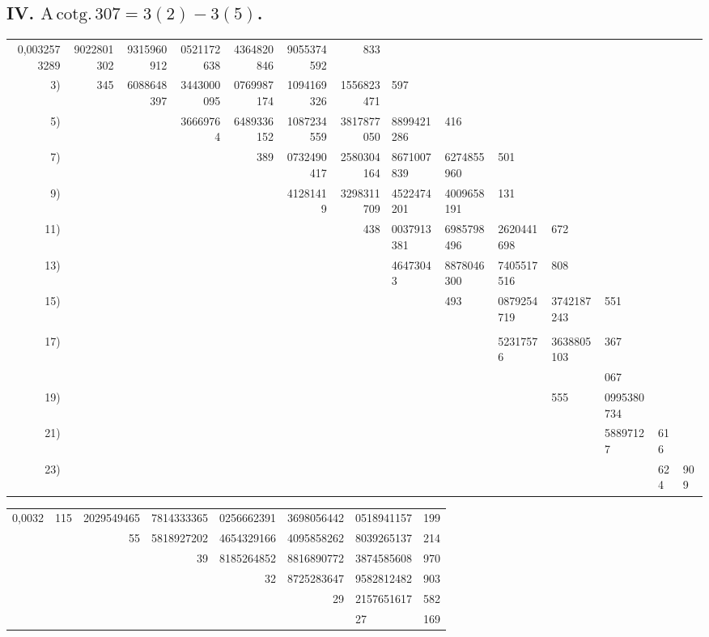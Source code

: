 \documentclass[10pt,a4paper]{article}
\begin{document}
\subsection*{IV. $\mathrm{A\,cotg.}\,307 = 3(2) - 3(5)$.}

\begin{center}
\begin{tabular}{r r r r r r r}
0,0032573289 & 9022801302 & 9315960912 & 0521172638 & 4364820846 & 9055374592 & 833 \\
3) & 345 & 6088648397 & 3443000095 & 0769987174 & 1094169326 & 1556823471 & 597 \\
5) & & & 36669764 & 6489336152 & 1087234559 & 3817877050 & 8899421286 & 416 \\
7) & & & & 389 & 0732490417 & 2580304164 & 8671007839 & 6274855960 & 501 \\
9) & & & & & 41281419 & 3298311709 & 4522474201 & 4009658191 & 131 \\
11) & & & & & & 438 & 0037913381 & 6985798496 & 2620441698 & 672 \\
13) & & & & & & & 46473043 & 8878046300 & 7405517516 & 808 \\
15) & & & & & & & & 493 & 0879254719 & 3742187243 & 551 \\
& & & & & & & & & & & \\
17) & & & & & & & & & 52317576 & 3638805103 & 367 \\
& & & & & & & & & & & 067 \\
19) & & & & & & & & & & 555 & 0995380734 \\
21) & & & & & & & & & & & 58897127 & 616 \\
23) & & & & & & & & & & & & 624 & 909 \\
\end{tabular}
\end{center}

\medskip

\begin{center}
\begin{tabular}{r r r r r r}
0,0032 & 115 & 2029549465 & 7814333365 & 0256662391 & 3698056442 & 0518941157 & 199 \\
& & 55 & 5818927202 & 4654329166 & 4095858262 & 8039265137 & 214 \\
& & & 39 & 8185264852 & 8816890772 & 3874585608 & 970 \\
& & & & 32 & 8725283647 & 9582812482 & 903 \\
& & & & & 29 & 2157651617 & 582 \\
& & & & & & 27 & 169 \\
\end{tabular}
\end{center}
\end{document}

